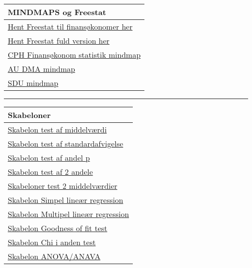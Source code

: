 \documentclass[]{book}
\begin{document}
\begin{longtable}[]{@{}l@{}}
\toprule
MINDMAPS og Freestat\tabularnewline
\midrule
\endhead
\href{https://www.dropbox.com/s/th8q95lf864npie/FREESTATfin.xlsx?dl=1}{Hent
Freestat til finansøkonomer her}\tabularnewline
\href{https://www.dropbox.com/s/a2jztexbxfzcli0/FREESTAT.xlsx?dl=1}{Hent
Freestat fuld version her}\tabularnewline
\href{https://drive.google.com/uc?export=download\&id=0B1E7VnhxsDMlQ1Zhdjh5WTJ4bnM}{CPH
Finansøkonom statistik mindmap}\tabularnewline
\href{https://drive.google.com/uc?export=download\&id=0B1E7VnhxsDMlVkJOYUtsSGl1TjA}{AU
DMA mindmap}\tabularnewline
\href{https://drive.google.com/uc?export=download\&id=0B1E7VnhxsDMlVVZ2TGYxZDltdjA}{SDU
mindmap}\tabularnewline
\bottomrule
\end{longtable}

\begin{center}\rule{0.5\linewidth}{\linethickness}\end{center}

\begin{longtable}[]{@{}l@{}}
\toprule
Skabeloner\tabularnewline
\midrule
\endhead
\href{https://www.dropbox.com/s/xygqhfe6wmxzntf/Skabelon\%20test\%20af\%20middelv\%C3\%A6rdi\%20\%CE\%BC.docx?dl=1}{Skabelon
test af middelværdi}\tabularnewline
\href{https://www.dropbox.com/s/m3vmdo47f6ocza3/skabelon\%20test\%20af\%20standardafvigelse.docx?dl=1}{Skabelon
test af standardafvigelse}\tabularnewline
\href{https://www.dropbox.com/s/vazc4t384xfw2vf/Skabelon\%20test\%20af\%20andel\%20p.docx?dl=1}{Skabelon
test af andel p}\tabularnewline
\href{https://www.dropbox.com/s/wbu8gaasar0i991/Skabelon\%20test\%20af\%202\%20andele.docx?dl=1}{Skabelon
test af 2 andele}\tabularnewline
\href{https://www.dropbox.com/s/9qv7i2xlt2ioiut/Skabeloner\%20test\%202\%20middelv\%C3\%A6rdier.docx?dl=1}{Skabeloner
test 2 middelværdier}\tabularnewline
\href{https://www.dropbox.com/s/8ppxk89bapfh53p/Skabelon\%20Simpel\%20line\%C3\%A6r\%20regression.docx?dl=1}{Skabelon
Simpel lineær regression}\tabularnewline
\href{https://www.dropbox.com/s/jghmkyl4ou66lim/Skabelon\%20Multipel\%20line\%C3\%A6r\%20regression\%20slutmodel.docx?dl=1}{Skabelon
Multipel lineær regression}\tabularnewline
\href{https://www.dropbox.com/s/ectavp709wtmv6p/Skabelon\%20Goodness\%20of\%20fit\%20test.docx?dl=1}{Skabelon
Goodness of fit test}\tabularnewline
\href{https://www.dropbox.com/s/gc0u8hdyrksa9jw/Skabelon\%20Chi\%20i\%20anden\%20test.docx?dl=1}{Skabelon
Chi i anden test}\tabularnewline
\href{https://www.dropbox.com/s/9q9joeo1gv8ywky/Skabelon\%20ANOVA\%3AANAVA.docx?dl=1}{Skabelon
ANOVA/ANAVA}\tabularnewline
\bottomrule
\end{longtable}
\end{document}
